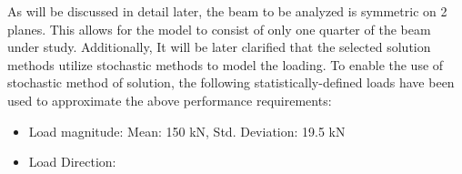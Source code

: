 As will be discussed in detail later, the beam to be analyzed is symmetric on 2 planes. This allows for the model to consist of only one quarter of the beam under study. Additionally, It will be later clarified that the selected solution methods utilize stochastic methods to model the loading. To enable the use of stochastic method of solution, the following statistically-defined loads have been used to approximate the above performance requirements: 

\begin{itemize}
\item Load magnitude: Mean: 150 kN, Std. Deviation: 19.5 kN
\item Load Direction:
\end{itemize}
